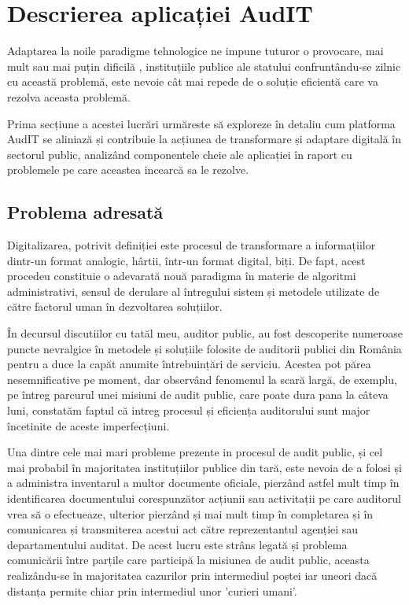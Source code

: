 \chapter{Descrierea aplicației AudIT}
Adaptarea la noile paradigme tehnologice ne impune tuturor o provocare, mai mult sau mai puțin dificilă , instituțiile publice ale statului confruntându-se zilnic cu această problemă, este nevoie cât mai repede de o soluție eficientă care va rezolva aceasta problemă.

\par Prima secțiune a acestei lucrări urmăreste să exploreze în detaliu cum platforma AudIT se aliniază și contribuie la acțiunea de transformare și adaptare digitală în sectorul public, analizând componentele cheie ale aplicației în raport cu problemele pe care aceastea incearcă sa le rezolve.


\section{Problema adresată}
Digitalizarea, potrivit definiției este procesul de transformare a informațiilor dintr-un format analogic, hârtii, într-un format digital, biți. De fapt, acest procedeu constituie o adevarată nouă paradigma în materie de algoritmi administrativi, sensul de derulare al întregului sistem și metodele utilizate de către factorul uman în dezvoltarea soluțiilor.
\par În decursul discutiilor  cu tatăl meu, auditor public, au fost descoperite numeroase 
puncte nevralgice în metodele și soluțiile folosite de auditorii publici din România pentru a duce la capăt anumite întrebuințări de serviciu. Acestea pot părea nesemnificative pe moment, dar observând fenomenul la scară largă, de exemplu,  pe întreg parcurul unei misiuni de audit public, care poate dura pana la câteva luni, constatăm faptul că intreg procesul și eficiența auditorului sunt major încetinite de aceste imperfecțiuni.

\par Una dintre cele mai mari probleme prezente in procesul de audit public, și cel mai probabil în majoritatea instituțiilor publice din tară, este nevoia de a folosi și a administra inventarul a multor documente oficiale, pierzând astfel mult timp în identificarea documentului corespunzător acțiunii sau activitații pe care auditorul vrea să o efectueaze, ulterior pierzând și mai mult timp în completarea și în comunicarea și transmiterea acestui act către reprezentantul agenției sau departamentului auditat. De acest lucru este strâns legată și problema comunicării între parțile care participă la misiunea de audit public, aceasta realizându-se în majoritatea cazurilor prin intermediul poștei iar uneori dacă distanța permite chiar prin intermediul unor 'curieri umani'. 

